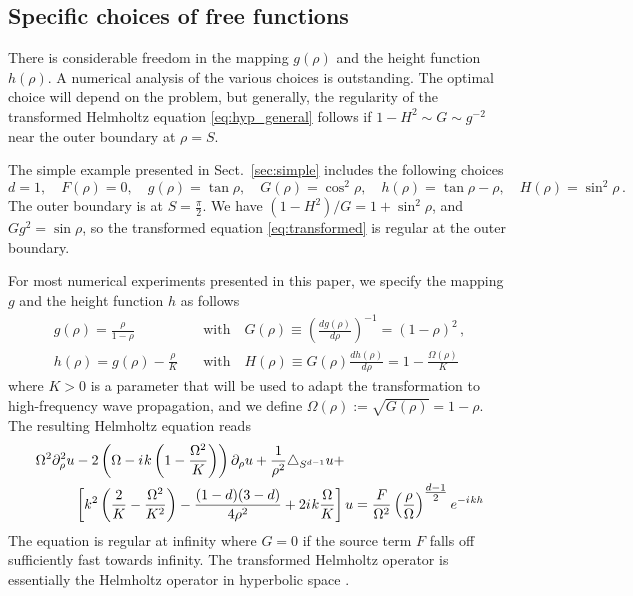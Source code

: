 \documentclass[final,onefignum,onetabnum]{siamart190516}
\newcommand{\iu}{{i\mkern1mu}}
\begin{document}
\subsection{Specific choices of free functions}
There is considerable freedom in the mapping $g(\rho)$ and the height function $h(\rho)$. A numerical analysis of the various choices is outstanding. The optimal choice will depend on the problem, but generally, the regularity of the transformed Helmholtz equation \eqref{eq:hyp_general} follows if $1-H^2\sim G\sim g^{-2}$ near the outer boundary at $\rho=S$. 

The simple example presented in Sect.~\ref{sec:simple} includes the following choices
\[ d=1, \quad F(\rho)=0, \quad g(\rho)=\tan \rho, \quad G(\rho) = \cos^2\rho, \quad h(\rho) =\tan\rho - \rho, \quad H(\rho)= \sin^2\rho\,.\]
The outer boundary is at $S=\tfrac{\pi}{2}$. We have $(1-H^2)/G = 1+\sin^2\rho$, and $G g^2 = \sin\rho$, so the transformed equation \eqref{eq:transformed} is regular at the outer boundary. 

For most numerical experiments presented in this paper, we specify the mapping $g$ and the height function $h$ as follows
\begin{align} 
\label{eq:g}
g(\rho) = \frac{\rho}{1-\rho} \quad &\mathrm{with}\quad G(\rho) \equiv \left(\frac{d g(\rho)}{d\rho}\right)^{-1} = (1-\rho)^2\,, \\
\label{eq:h}
h(\rho) = g(\rho) - \frac{\rho}{K} \quad &\mathrm{with}\quad H(\rho) \equiv G(\rho) \frac{d h(\rho)}{d\rho} = 1 - \frac{\Omega(\rho)}{K} 
\end{align}
where $K>0$ is a parameter that will be used to adapt the transformation to high-frequency wave propagation, and we define $\Omega(\rho):=\sqrt{G(\rho)} = 1-\rho$. 
The resulting Helmholtz equation reads
\begin{align}\label{eq:hyp_specific}
	\Omega^2 \partial_\rho^2 u & - 2\left(\Omega - \iu k \left(1-\frac{\Omega^2}{K}\right)\right) \partial_\rho u + \frac{1}{\rho^2}\triangle_{S^{d-1}} u + \nonumber \\
	             & \left[k^2 \left( \frac{2}{K} - \frac{\Omega^2}{K^2} \right) - \frac{(1-d)(3-d)}{4 \rho^2} + 2 \iu k \frac{\Omega}{K} \right] u = \frac{F}{\Omega^2} \left(\frac{\rho}{\Omega}\right)^{\tfrac{d-1}{2}} e^{-\iu k h}
\end{align}
The equation is regular at infinity where $G=0$ if the source term $F$ falls off sufficiently fast towards infinity. The transformed Helmholtz operator is essentially the Helmholtz operator in hyperbolic space \cite{stoll2016harmonic}. 
\end{document}
